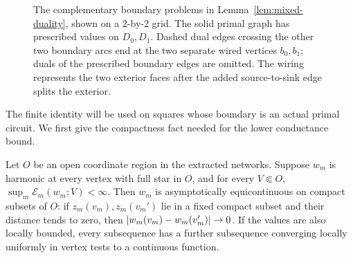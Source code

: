 \begin{figure}[t]
 \centering
 
 \caption{The complementary boundary problems in
 Lemma~\ref{lem:mixed-duality}, shown on a \(2\)-by-\(2\) grid.
 The solid primal graph has prescribed values on \(D_0,D_1\).
 Dashed dual edges crossing the other two boundary arcs end at the two
 separate wired vertices \(b_0,b_1\); duals of the prescribed boundary
 edges are omitted.  The wiring represents the two exterior faces after
 the added source-to-sink edge splits the exterior.}
 \label{fig:mixed-boundary-duality}
\end{figure}

The finite identity will be used on squares whose boundary is an actual
primal circuit.  We first give the compactness fact needed for the lower
conductance bound.

\begin{lemma}\label{lem:harmonic-compactness}
Let \(O\) be an open coordinate region in the extracted networks.  Suppose
\(w_m\) is harmonic at every vertex with full star in \(O\), and for every
\(V\Subset O\),
\(\sup_m\mathcal E_m(w_m;V)<\infty\).
Then \(w_m\) is asymptotically equicontinuous on compact subsets of \(O\):
if \(z_m(v_m),z_m(v_m')\) lie in a fixed compact subset and their distance
tends to zero, then
\(\lvert w_m(v_m)-w_m(v_m')\rvert\to0\).
If the values are also locally bounded, every subsequence has a further
subsequence converging locally uniformly in vertex tests to a continuous
function.
\end{lemma}

